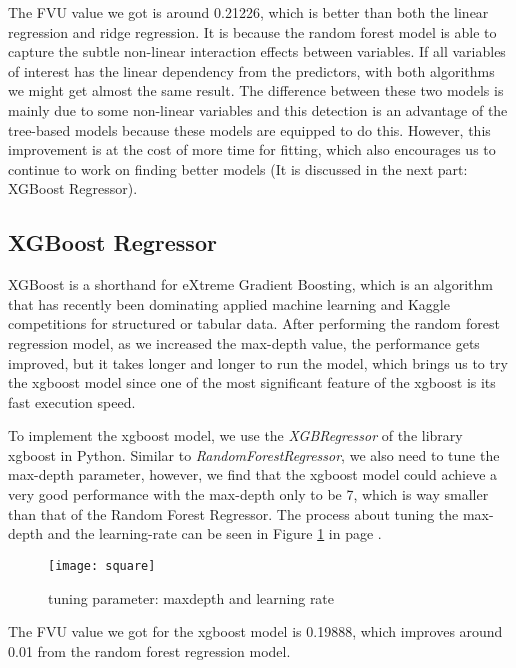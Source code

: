 \par The FVU value we got is around 0.21226, which is better than both the linear regression and ridge regression. It is because the random forest model is able to capture the subtle non-linear interaction effects between variables. If all variables of interest has the linear dependency from the predictors, with both algorithms we might get almost the same result. The difference between these two models is mainly due to some non-linear variables and this detection is an advantage of the tree-based models because these models are equipped to do this. However, this improvement is at the cost of more time for fitting, which also encourages us to continue to work on finding better models (It is discussed in the next part: XGBoost Regressor).

\subsection{XGBoost Regressor}
XGBoost is a shorthand for eXtreme Gradient Boosting, which is an algorithm that has recently been dominating applied machine learning and Kaggle competitions for structured or tabular data\cite{xgb}. After performing the random forest regression model, as we increased the max-depth value, the performance gets improved, but it takes longer and longer to run the model, which brings us to try the xgboost model since one of the most significant feature of the xgboost is its fast execution speed\cite{adv}. 
\par To implement the xgboost model, we use the \textit{XGBRegressor} of the library xgboost in Python. Similar to \textit{RandomForestRegressor}, we also need to tune the max-depth parameter, however, we find that the xgboost model could achieve a very good performance with the max-depth only to be 7, which is way smaller than that of the Random Forest Regressor. The process about tuning the max-depth and the learning-rate can be seen in Figure \ref{fig_squ} in page \pageref{fig_squ}.

  \begin{figure}[h!]
  \centering
  \texttt{[image: square]}
  \caption{tuning parameter: maxdepth and learning rate}
  \label{fig_squ}
  \end{figure}

\par The FVU value we got for the xgboost model is 0.19888, which improves around 0.01 from the random forest regression model.



